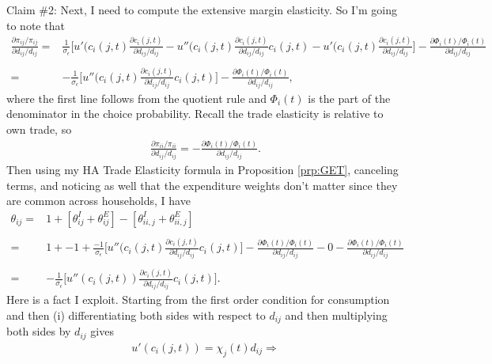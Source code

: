 \documentclass[12pt,pdftex]{article}
\begin{document}
\begin{onehalfspacing}
Claim \#2: Next, I need to compute the extensive margin elasticity. So I'm going to note that
{\small
\begin{align}
\frac{\partial \pi_{ij} / \pi_{ij}}{\partial d_{ij} / d_{ij}} =& \frac{1}{\sigma_{\epsilon}} \bigg [ u'(c_{i}(j,t)\frac{\partial c_{i}(j,t)}{\partial d_{ij}/ d_{ij}} - u''(c_{i}(j,t)\frac{\partial c_{i}(j,t)}{\partial d_{ij}/ d_{ij}}c_{i}(j,t) - u'(c_{i}(j,t)\frac{\partial c_{i}(j,t)}{\partial d_{ij}/ d_{ij}} \bigg] - \frac{\partial \Phi_{i}(t) /\Phi_i(t)}{\partial d_{ij}/ d_{ij}} \\
\nonumber \\
=& -\frac{1}{\sigma_{\epsilon}} \bigg [ u''(c_{i}(j,t)\frac{\partial c_{i}(j,t)}{\partial d_{ij}/ d_{ij}}c_{i}(j,t) \bigg] - \frac{\partial \Phi_{i}(t) /\Phi_i(t)}{\partial d_{ij}/ d_{ij}},
\end{align}}
where the first line follows from the quotient rule and $\Phi_{i}(t)$ is the part of the denominator in the choice probability. Recall the trade elasticity is relative to own trade, so
\begin{align}
\frac{\partial \pi_{ii} / \pi_{ii}}{\partial d_{ij} / d_{ij}} = - \frac{\partial \Phi_{i}(t) /\Phi_i(t)}{\partial d_{ij}/ d_{ij}}.
\end{align}
Then using my HA Trade Elasticity formula in Proposition \ref{prp:GET}, canceling terms, and noticing as well that the expenditure weights don't matter since they are common across households, I have
{\small
\begin{align}
\theta_{ij} =& 1 + \left [\theta_{ij}^{I} + \theta_{ij}^{E} \right ]  - \left [ \theta_{ii,j}^{I} + \theta_{ii,j}^{E} \right ]  \\
\nonumber \\
= & 1 + -1 + \frac{-1}{\sigma_{\epsilon}} \bigg [ u''(c_{i}(j,t)\frac{\partial c_{i}(j,t)}{\partial d_{ij}/ d_{ij}}c_{i}(j,t) \bigg] - \frac{\partial \Phi_{i}(t) /\Phi_i(t)}{\partial d_{ij}/ d_{ij}} - 0  - \frac{\partial \Phi_{i}(t) /\Phi_i(t)}{\partial d_{ij}/ d_{ij}} \\
\nonumber \\
= & -\frac{1}{\sigma_{\epsilon}} \bigg [ u''(c_{i}(j,t))\frac{\partial c_{i}(j,t)}{\partial d_{ij}/ d_{ij}}c_{i}(j,t) \bigg].
\end{align}}
Here is a fact I exploit. Starting from the first order condition for consumption and then (i) differentiating both sides with respect to $d_{ij}$ and then multiplying both sides by $d_{ij}$ gives
\begin{align}
u'(c_{i}(j,t) ) = \chi_{j}(t) d_{ij} \Rightarrow \\

\end{align}
\end{onehalfspacing}
\end{document}
